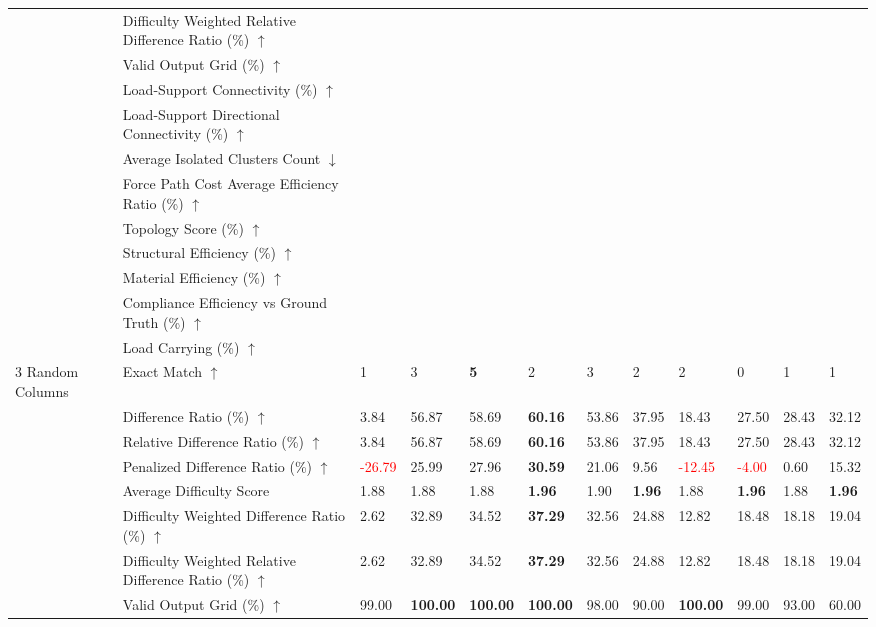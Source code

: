 \begin{table}[!h]
{\begin{tabular}{llllllllllll}
 & Difficulty Weighted Relative Difference Ratio (\%) $\uparrow$ &  &  &  &  &  &  &  &  &  &  \\
 & Valid Output Grid (\%) $\uparrow$ &  &  &  &  &  &  &  &  &  &  \\
 & Load-Support Connectivity (\%) $\uparrow$ &  &  &  &  &  &  &  &  &  &  \\
 & Load-Support Directional Connectivity (\%) $\uparrow$ &  &  &  &  &  &  &  &  &  &  \\
 & Average Isolated Clusters Count $\downarrow$ &  &  &  &  &  &  &  &  &  &  \\
 & Force Path Cost Average Efficiency Ratio (\%) $\uparrow$ &  &  &  &  &  &  &  &  &  &  \\
 & Topology Score (\%) $\uparrow$ &  &  &  &  &  &  &  &  &  &  \\
 & Structural Efficiency (\%) $\uparrow$ &  &  &  &  &  &  &  &  &  &  \\
 & Material Efficiency (\%) $\uparrow$ &  &  &  &  &  &  &  &  &  &  \\
 & Compliance Efficiency vs Ground Truth (\%) $\uparrow$ &  &  &  &  &  &  &  &  &  &  \\
 & Load Carrying (\%) $\uparrow$ &  &  &  &  &  &  &  &  &  &  \\
3 Random Columns & Exact Match $\uparrow$ & 1 & 3 & \textbf{5} & 2 & 3 & 2 & 2 & 0 & 1 & 1 \\
 & Difference Ratio (\%) $\uparrow$ & 3.84 & 56.87 & 58.69 & \textbf{60.16} & 53.86 & 37.95 & 18.43 & 27.50 & 28.43 & 32.12 \\
 & Relative Difference Ratio (\%) $\uparrow$ & 3.84 & 56.87 & 58.69 & \textbf{60.16} & 53.86 & 37.95 & 18.43 & 27.50 & 28.43 & 32.12 \\
 & Penalized Difference Ratio (\%) $\uparrow$ & \textcolor{red}{-26.79} & 25.99 & 27.96 & \textbf{30.59} & 21.06 & 9.56 & \textcolor{red}{-12.45} & \textcolor{red}{-4.00} & 0.60 & 15.32 \\
 & Average Difficulty Score & 1.88 & 1.88 & 1.88 & \textbf{1.96} & 1.90 & \textbf{1.96} & 1.88 & \textbf{1.96} & 1.88 & \textbf{1.96} \\
 & Difficulty Weighted Difference Ratio (\%) $\uparrow$ & 2.62 & 32.89 & 34.52 & \textbf{37.29} & 32.56 & 24.88 & 12.82 & 18.48 & 18.18 & 19.04 \\
 & Difficulty Weighted Relative Difference Ratio (\%) $\uparrow$ & 2.62 & 32.89 & 34.52 & \textbf{37.29} & 32.56 & 24.88 & 12.82 & 18.48 & 18.18 & 19.04 \\
 & Valid Output Grid (\%) $\uparrow$ & 99.00 & \textbf{100.00} & \textbf{100.00} & \textbf{100.00} & 98.00 & 90.00 & \textbf{100.00} & 99.00 & 93.00 & 60.00 \\

\end{tabular}}
\end{table}
